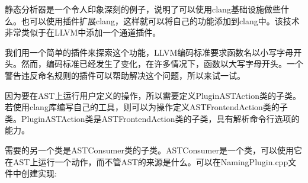 
静态分析器是一个令人印象深刻的例子，说明了可以使用clang基础设施做些什么。也可以使用插件扩展clang，这样就可以将自己的功能添加到clang中。该技术非常类似于在LLVM中添加一个通道插件。

我们用一个简单的插件来探索这个功能，LLVM编码标准要求函数名以小写字母开头。然而，编码标准已经发生了变化，在许多情况下，函数以大写字母开头。一个警告违反命名规则的插件可以帮助解决这个问题，所以来试一试。

因为要在AST上运行用户定义的操作，所以需要定义PluginASTAction类的子类。若使用clang库编写自己的工具，则可以为操作定义ASTFrontendAction类的子类。PluginASTAction类是ASTFrontendAction类的子类，具有解析命令行选项的能力。

需要的另一个类是ASTConsumer类的子类。ASTConsumer是一个类，可以使用它在AST上运行一个动作，而不管AST的来源是什么。可以在NamingPlugin.cpp文件中创建实现:

